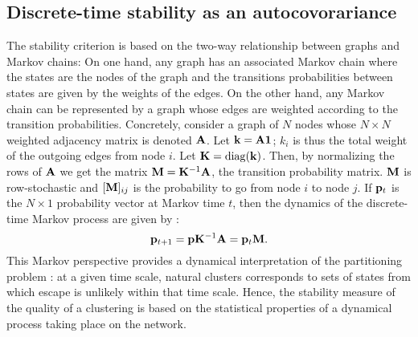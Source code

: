 \subsection{Discrete-time stability as an autocovorariance}
The stability criterion is based on the two-way relationship between graphs and Markov chains: On one hand, any graph has an associated Markov chain where the states are the nodes of the graph and the transitions probabilities between states are given by the weights of the edges. On the other hand, any Markov chain can be represented by a graph whose edges are weighted according to the transition probabilities. Concretely, consider a graph of $N$ nodes whose $N \times N$ weighted adjacency matrix is denoted $\mathbf A$. Let $\mathbf k = \mathbf A \mathbf 1$; $k_i$ is thus the total weight of the outgoing edges from node $i$. Let $\mathbf K = \mathrm{diag}(\mathbf k)$. Then, by normalizing the rows of $\mathbf A$ we get the matrix $\mathbf M = \mathbf K^{-1}\mathbf A$, the transition probability matrix. $\mathbf M$ is row-stochastic and $[\mathbf M]_{ij}$ is the probability to go from node $i$ to node $j$. If $\mathbf p_t$ is the $N \times 1$ probability vector at Markov time $t$, then the dynamics of the discrete-time Markov process are given by :
\begin{equation} \label{eq:discreteMP}
	\mathbf p_{t+1} = \mathbf p \mathbf K^{-1}\mathbf A = \mathbf p_t \mathbf M.  	
\end{equation} 
This Markov perspective provides a dynamical interpretation of the partitioning problem : at a given time scale, natural clusters corresponds to sets of states from which escape is unlikely within that time scale. Hence, the stability measure of the quality of a clustering is based on the statistical properties of a dynamical process taking place on the network. 

